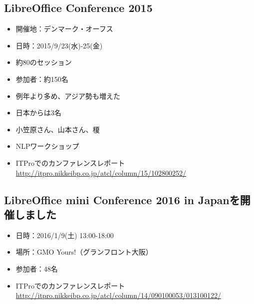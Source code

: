 \documentclass[mingoth,a4paper]{jsarticle}
\begin{document}
\subsection{LibreOffice Conference 2015}
\begin{itemize}
\item %
開催地：デンマーク・オーフス
\item %
日時：2015/9/23(水)-25(金)
\item %
約80のセッション
\item %
参加者：約150名
\item %
例年より多め、アジア勢も増えた
\item %
日本からは3名
\item %
小笠原さん、山本さん、榎
\item %
NLPワークショップ
\item %
ITProでのカンファレンスレポート\url{http://itpro.nikkeibp.co.jp/atcl/column/15/102800252/}
\end{itemize}


\subsection{LibreOffice mini Conference 2016 in Japanを開催しました}
\begin{itemize}
\item %
日時：2016/1/9(土) 13:00-18:00
\item %
場所：GMO Yours!（グランフロント大阪）
\item %
参加者：48名
\item %
ITProでのカンファレンスレポート\url{http://itpro.nikkeibp.co.jp/atcl/column/14/090100053/013100122/}
\end{itemize}
\end{document}
